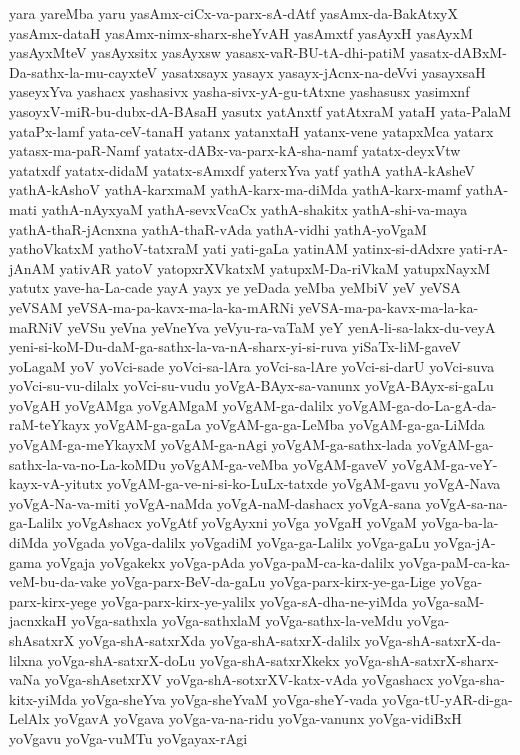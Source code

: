 {yara
yareMba
yaru
yasAmx-ciCx-va-parx-sA-dAtf
yasAmx-da-BakAtxyX
yasAmx-dataH
yasAmx-nimx-sharx-sheYvAH
yasAmxtf
yasAyxH
yasAyxM
yasAyxMteV
yasAyxsitx
yasAyxsw
yasasx-vaR-BU-tA-dhi-patiM
yasatx-dABxM-Da-sathx-la-mu-cayxteV
yasatxsayx
yasayx
yasayx-jAcnx-na-deVvi
yasayxsaH
yaseyxYva
yashacx
yashasivx
yasha-sivx-yA-gu-tAtxne
yashasusx
yasimxnf
yasoyxV-miR-bu-dubx-dA-BAsaH
yasutx
yatAnxtf
yatAtxraM
yataH
yata-PalaM
yataPx-lamf
yata-ceV-tanaH
yatanx
yatanxtaH
yatanx-vene
yatapxMca
yatarx
yatasx-ma-paR-Namf
yatatx-dABx-va-parx-kA-sha-namf
yatatx-deyxVtw
yatatxdf
yatatx-didaM
yatatx-sAmxdf
yaterxYva
yatf
yathA
yathA-kAsheV
yathA-kAshoV
yathA-karxmaM
yathA-karx-ma-diMda
yathA-karx-mamf
yathA-mati
yathA-nAyxyaM
yathA-sevxVcaCx
yathA-shakitx
yathA-shi-va-maya
yathA-thaR-jAcnxna
yathA-thaR-vAda
yathA-vidhi
yathA-yoVgaM
yathoVkatxM
yathoV-tatxraM
yati
yati-gaLa
yatinAM
yatinx-si-dAdxre
yati-rA-jAnAM
yativAR
yatoV
yatopxrXVkatxM
yatupxM-Da-riVkaM
yatupxNayxM
yatutx
yave-ha-La-cade
yayA
yayx
ye
yeDada
yeMba
yeMbiV
yeV
yeVSA
yeVSAM
yeVSA-ma-pa-kavx-ma-la-ka-mARNi
yeVSA-ma-pa-kavx-ma-la-ka-maRNiV
yeVSu
yeVna
yeVneYva
yeVyu-ra-vaTaM
yeY
yenA-li-sa-lakx-du-veyA
yeni-si-koM-Du-daM-ga-sathx-la-va-nA-sharx-yi-si-ruva
yiSaTx-liM-gaveV
yoLagaM
yoV
yoVci-sade
yoVci-sa-lAra
yoVci-sa-lAre
yoVci-si-darU
yoVci-suva
yoVci-su-vu-dilalx
yoVci-su-vudu
yoVgA-BAyx-sa-vanunx
yoVgA-BAyx-si-gaLu
yoVgAH
yoVgAMga
yoVgAMgaM
yoVgAM-ga-dalilx
yoVgAM-ga-do-La-gA-da-raM-teYkayx
yoVgAM-ga-gaLa
yoVgAM-ga-ga-LeMba
yoVgAM-ga-ga-LiMda
yoVgAM-ga-meYkayxM
yoVgAM-ga-nAgi
yoVgAM-ga-sathx-lada
yoVgAM-ga-sathx-la-va-no-La-koMDu
yoVgAM-ga-veMba
yoVgAM-gaveV
yoVgAM-ga-veY-kayx-vA-yitutx
yoVgAM-ga-ve-ni-si-ko-LuLx-tatxde
yoVgAM-gavu
yoVgA-Nava
yoVgA-Na-va-miti
yoVgA-naMda
yoVgA-naM-dashacx
yoVgA-sana
yoVgA-sa-na-ga-Lalilx
yoVgAshacx
yoVgAtf
yoVgAyxni
yoVga
yoVgaH
yoVgaM
yoVga-ba-la-diMda
yoVgada
yoVga-dalilx
yoVgadiM
yoVga-ga-Lalilx
yoVga-gaLu
yoVga-jA-gama
yoVgaja
yoVgakekx
yoVga-pAda
yoVga-paM-ca-ka-dalilx
yoVga-paM-ca-ka-veM-bu-da-vake
yoVga-parx-BeV-da-gaLu
yoVga-parx-kirx-ye-ga-Lige
yoVga-parx-kirx-yege
yoVga-parx-kirx-ye-yalilx
yoVga-sA-dha-ne-yiMda
yoVga-saM-jacnxkaH
yoVga-sathxla
yoVga-sathxlaM
yoVga-sathx-la-veMdu
yoVga-shAsatxrX
yoVga-shA-satxrXda
yoVga-shA-satxrX-dalilx
yoVga-shA-satxrX-da-lilxna
yoVga-shA-satxrX-doLu
yoVga-shA-satxrXkekx
yoVga-shA-satxrX-sharx-vaNa
yoVga-shAsetxrXV
yoVga-shA-sotxrXV-katx-vAda
yoVgashacx
yoVga-sha-kitx-yiMda
yoVga-sheYva
yoVga-sheYvaM
yoVga-sheY-vada
yoVga-tU-yAR-di-ga-LelAlx
yoVgavA
yoVgava
yoVga-va-na-ridu
yoVga-vanunx
yoVga-vidiBxH
yoVgavu
yoVga-vuMTu
yoVgayax-rAgi
}
